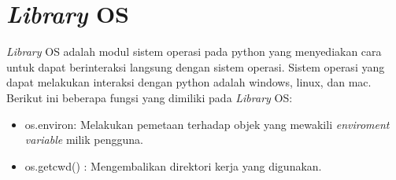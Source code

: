 \section{\textit{Library} OS}
\textit{Library} OS adalah modul sistem operasi pada python yang menyediakan cara untuk dapat berinteraksi langsung dengan sistem operasi. Sistem operasi yang dapat melakukan interaksi dengan python adalah windows, linux, dan mac. Berikut ini beberapa fungsi yang dimiliki pada \textit{Library} OS:
\begin{itemize}
	\item os.environ: Melakukan pemetaan terhadap objek yang mewakili \textit{enviroment variable} milik pengguna.
	\item os.getcwd() : Mengembalikan direktori kerja yang digunakan. 
\end{itemize}
